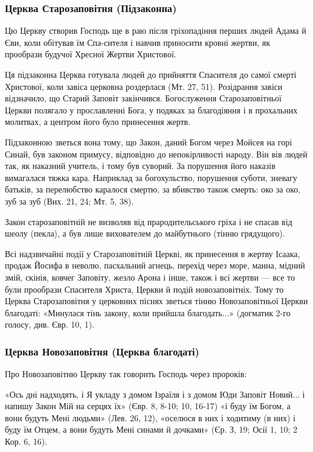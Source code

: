 \documentclass[main.tex]{subfiles}
\begin{document}
\subsubsection{Церква Старозаповітня (Підзаконна)}

Цю Церкву створив Господь ще в раю після гріхопадіння перших людей Адама й Єви, коли обітував їм Спа-сителя і навчив приносити кровні жертви, як прообрази будучої Хресної Жертви Христової.

Ця підзаконна Церква готувала людей до прийняття Спасителя до самої смерті Христової, коли завіса церковна роздерлася (Мт. 27, 51). Розідрання завіси відзначило, що Старий Заповіт закінчився. Богослуження Старозаповітньої Церкви полягало у прославленні Бога, у подяках за благодіяння і в прохальних молитвах, а центром його було принесення жертв.

Підзаконною зветься вона тому, що Закон, даний Богом через Мойсея на горі Синай, був законом примусу, відповідно до непокірливості народу. Він вів людей так, як наказний учитель, і тому був суворий. За порушення його наказів вимагалася тяжка кара. Наприклад за богохульство, порушення суботи, зневагу батьків, за перелюбство каралося смертю, за вбивство також смерть: око за око, зуб за зуб (Вих. 21, 24; Мт. 5, 38).

Закон старозаповітній не визволяв від прародительського гріха і не спасав від шеолу (пекла), а був лише вихователем до майбутнього (тінню грядущого).

Всі надзвичайні події у Старозаповітній Церкві, як принесення в жертву Ісаака, продаж Йосифа в неволю, пасхальний агнець, перехід через море, манна, мідний змій, скінія, ковчег Заповіту, жезло Арона і інше, також і всі жертви — все то були прообрази Спасителя Христа, Церкви й подій новозаповітніх. Тому то Церква Старозаповітня у церковних піснях зветься тінню Новозаповітньої Церкви благодаті: «Минулася тінь закону, коли прийшла благодать...» (догматик 2-го голосу, див. Євр. 10, 1).

\subsubsection{Церква Новозаповітня (Церква благодаті)}

Про Новозаповітню Церкву так говорить Господь через пророків:

«Ось дні надходять, і Я укладу з домом Ізраїля і з домом Юди Заповіт Новий... і напишу Закон Мій на серцях їх» (Євр. 8, 8-10; 10, 16-17) «і буду їм Богом, а вони будуть Мені людьми» (Лев. 26, 12), «оселюся в них і ходитиму (в них) і буду їм Отцем, а вони будуть Мені синами й дочками» (Єр. З, 19; Осії 1, 10; 2 Кор. 6, 16).
\end{document}
